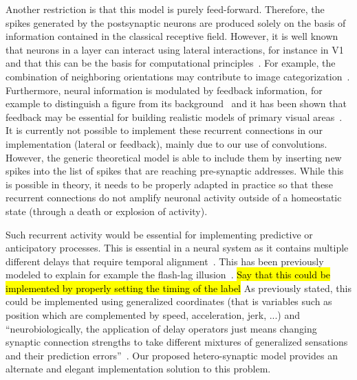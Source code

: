 \documentclass[default]{sn-jnl}%
\theoremstyle{thmstyleone}%
\theoremstyle{thmstyletwo}%
\theoremstyle{thmstylethree}%
\DeclareRobustCommand{\note}[1]{{\sethlcolor{yellow}\hl{#1}}}
\begin{document}
Another restriction is that this model is purely feed-forward. Therefore, the spikes generated by the postsynaptic neurons are produced solely on the basis of information contained in the classical receptive field. However, it is well known that neurons in a layer can interact using lateral interactions, for instance in V1 and that this can be the basis for computational principles~\citep{chavane_revisiting_2022}. For example, the combination of neighboring orientations may contribute to image categorization~\citep{perrinet_edge_2015}. Furthermore, neural information is modulated by feedback information, for example to distinguish a figure from its background~\citep{roelfsema_early_2016} and it has been shown that feedback may be essential for building realistic models of primary visual areas~\citep{boutin_sparse_2020, boutin_effect_2020, boutin_pooling_2022}. It is currently not possible to implement these recurrent connections in our implementation (lateral or feedback), mainly due to our use of convolutions. However, the generic theoretical model is able to include them by inserting new spikes into the list of spikes that are reaching pre-synaptic addresses. While this is possible in theory, it needs to be properly adapted in practice so that these recurrent connections do not amplify neuronal activity outside of a homeostatic state (through a death or explosion of activity). 

Such recurrent activity would be essential for implementing predictive or anticipatory processes. This is essential in a neural system as it contains multiple different delays that require temporal alignment~\citep{hogendoorn_predictive_2019}. This has been previously modeled to explain for example the flash-lag illusion~\citep{khoei_flash-lag_2017}. \note{Say that this could be implemented by properly setting the timing of the label} As previously stated, this could be implemented using generalized coordinates (that is variables such as position which are complemented by speed, acceleration, jerk, ...) and ``neurobiologically, the application of delay operators just means changing synaptic connection strengths to take different mixtures of generalized sensations and their prediction errors''~\citep{perrinet_active_2014}. Our proposed hetero-synaptic model provides an alternate and elegant implementation solution to this problem.
%
\end{document}
